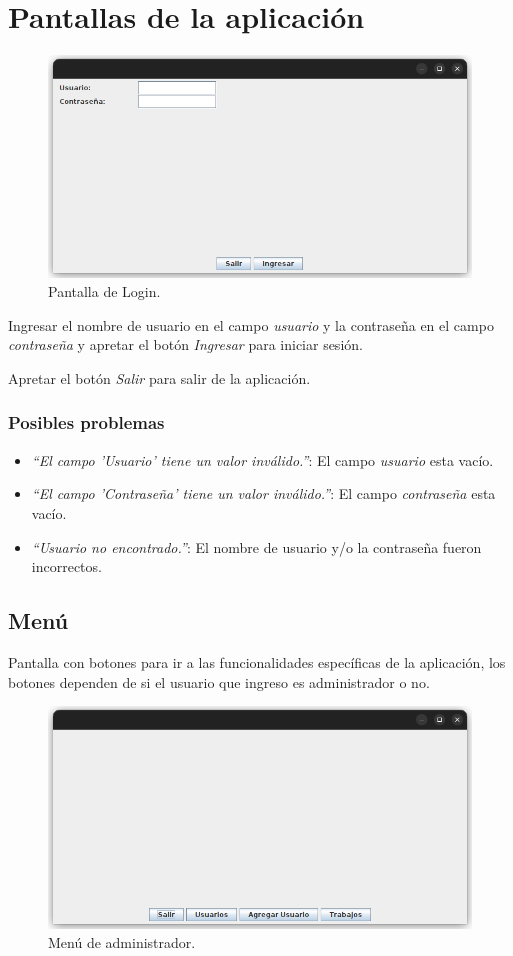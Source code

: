 \documentclass{article}
\begin{document}
\newpage

\section{Pantallas de la aplicación}

\begin{figure}[h]
    \centering
    \includegraphics[width=0.7\linewidth,keepaspectratio]{login-frame.png}
    \caption{Pantalla de Login.}
\end{figure}


Ingresar el nombre de usuario en el campo \emph{usuario} y la contraseña en el campo \emph{contraseña} y apretar el botón \emph{Ingresar} para iniciar sesión.

Apretar el botón \emph{Salir} para salir de la aplicación.

\subsubsection*{Posibles problemas}

\begin{itemize}
    \item \emph{``El campo 'Usuario' tiene un valor inválido.''}: El campo \emph{usuario} esta vacío.
    \item \emph{``El campo 'Contraseña' tiene un valor inválido.''}: El campo \emph{contraseña} esta vacío.
    \item \emph{``Usuario no encontrado.''}: El nombre de usuario y/o la contraseña fueron incorrectos.
\end{itemize}

\subsection{Menú}

Pantalla con botones para ir a las funcionalidades específicas de la aplicación, los botones dependen de si el usuario que ingreso es administrador o no.

\begin{figure}[h]
    \centering
    \includegraphics[width=0.7\linewidth,keepaspectratio]{menu-admin.png}
    \caption{Menú de administrador.}
\end{figure}
\end{document}
